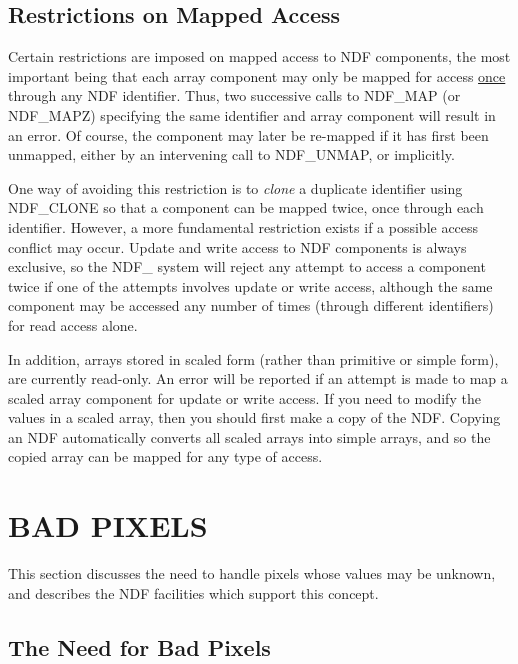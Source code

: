 \documentclass[twoside,11pt]{article}
\newcommand{\htmlref}[2]{#1}
\newcommand{\xlabel}[1]{}
\newcommand{\st}[1]{{\em{#1}}}
\begin{document}
\subsection{\xlabel{restrictions_on_mapped_access}\label{ss:restrictionsonmapping}Restrictions on Mapped Access}

Certain restrictions are imposed on mapped access to NDF components, the
most important being that each array component may only be mapped for access
\underline{once} through any NDF identifier. 
Thus, two successive calls to \htmlref{NDF\_MAP}{NDF_MAP} (or \htmlref{NDF\_MAPZ}{NDF_MAPZ}) specifying the same
identifier and array component will result in an error. 
Of course, the component may later be re-mapped if it has first been
unmapped, either by an intervening call to \htmlref{NDF\_UNMAP}{NDF_UNMAP}, or implicitly.

One way of avoiding this restriction is to \st{clone\/} a duplicate identifier
using \htmlref{NDF\_CLONE}{NDF_CLONE} so that a component can be mapped twice, once through each
identifier. 
However, a more fundamental restriction exists if a possible access conflict may
occur.
Update and write access to NDF components is always exclusive, so the NDF\_
system will reject any attempt to access a component twice if one of the
attempts involves update or write access, although the same component may be
accessed any number of times (through different identifiers) for read access
alone.

In addition, arrays stored in scaled form (rather than primitive
or simple form), are currently read-only. An error will be reported if an
attempt is made to map a scaled array component for update or write access.
If you need to modify the values in a scaled array, then you should first
make a copy of the NDF. Copying an NDF automatically converts all scaled
arrays into simple arrays, and so the copied array can be mapped for any 
type of access.

\section{\xlabel{bad_pixels}\label{ss:badpixels}BAD PIXELS}

This section discusses the need to handle pixels whose values may be
unknown, and describes the NDF facilities which support this concept. 

\subsection{\xlabel{the_need_for_bad_pixels}The Need for Bad Pixels}
\end{document}
